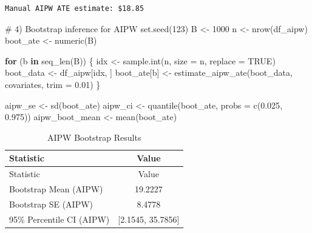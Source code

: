 \documentclass[
  letterpaper,
  DIV=11,
  numbers=noendperiod]{scrartcl}
\newenvironment{Shaded}{\begin{snugshade}}{\end{snugshade}}
\newcommand{\AttributeTok}[1]{\textcolor[rgb]{0.40,0.45,0.13}{#1}}
\newcommand{\CommentTok}[1]{\textcolor[rgb]{0.37,0.37,0.37}{#1}}
\newcommand{\ConstantTok}[1]{\textcolor[rgb]{0.56,0.35,0.01}{#1}}
\newcommand{\ControlFlowTok}[1]{\textcolor[rgb]{0.00,0.23,0.31}{\textbf{#1}}}
\newcommand{\DecValTok}[1]{\textcolor[rgb]{0.68,0.00,0.00}{#1}}
\newcommand{\FloatTok}[1]{\textcolor[rgb]{0.68,0.00,0.00}{#1}}
\newcommand{\FunctionTok}[1]{\textcolor[rgb]{0.28,0.35,0.67}{#1}}
\newcommand{\NormalTok}[1]{\textcolor[rgb]{0.00,0.23,0.31}{#1}}
\newcommand{\OtherTok}[1]{\textcolor[rgb]{0.00,0.23,0.31}{#1}}
\newcommand{\SpecialCharTok}[1]{\textcolor[rgb]{0.37,0.37,0.37}{#1}}
\newcommand{\StringTok}[1]{\textcolor[rgb]{0.13,0.47,0.30}{#1}}
\begin{document}
\begin{Shaded}
\end{Shaded}

\begin{verbatim}
Manual AIPW ATE estimate: $18.85
\end{verbatim}

\begin{Shaded}
\begin{Highlighting}[]
\CommentTok{\# 4) Bootstrap inference for AIPW}
\FunctionTok{set.seed}\NormalTok{(}\DecValTok{123}\NormalTok{)}
\NormalTok{B }\OtherTok{\textless{}{-}} \DecValTok{1000}
\NormalTok{n }\OtherTok{\textless{}{-}} \FunctionTok{nrow}\NormalTok{(df\_aipw)}
\NormalTok{boot\_ate }\OtherTok{\textless{}{-}} \FunctionTok{numeric}\NormalTok{(B)}

\ControlFlowTok{for}\NormalTok{ (b }\ControlFlowTok{in} \FunctionTok{seq\_len}\NormalTok{(B)) \{}
\NormalTok{  idx }\OtherTok{\textless{}{-}} \FunctionTok{sample.int}\NormalTok{(n, }\AttributeTok{size =}\NormalTok{ n, }\AttributeTok{replace =} \ConstantTok{TRUE}\NormalTok{)}
\NormalTok{  boot\_data }\OtherTok{\textless{}{-}}\NormalTok{ df\_aipw[idx, ]}
\NormalTok{  boot\_ate[b] }\OtherTok{\textless{}{-}} \FunctionTok{estimate\_aipw\_ate}\NormalTok{(boot\_data, covariates, }\AttributeTok{trim =} \FloatTok{0.01}\NormalTok{)}
\NormalTok{\}}

\NormalTok{aipw\_se }\OtherTok{\textless{}{-}} \FunctionTok{sd}\NormalTok{(boot\_ate)}
\NormalTok{aipw\_ci }\OtherTok{\textless{}{-}} \FunctionTok{quantile}\NormalTok{(boot\_ate, }\AttributeTok{probs =} \FunctionTok{c}\NormalTok{(}\FloatTok{0.025}\NormalTok{, }\FloatTok{0.975}\NormalTok{))}
\NormalTok{aipw\_boot\_mean }\OtherTok{\textless{}{-}} \FunctionTok{mean}\NormalTok{(boot\_ate)}
\end{Highlighting}
\end{Shaded}

\begin{longtable}[]{@{}lc@{}}
\caption{AIPW Bootstrap Results}\tabularnewline
\toprule\noalign{}
Statistic & Value \\
\midrule\noalign{}
\endfirsthead
\toprule\noalign{}
Statistic & Value \\
\midrule\noalign{}
\endhead
\bottomrule\noalign{}
\endlastfoot
Bootstrap Mean (AIPW) & 19.2227 \\
Bootstrap SE (AIPW) & 8.4778 \\
95\% Percentile CI (AIPW) & {[}2.1545, 35.7856{]} \\
\end{longtable}
\end{document}
